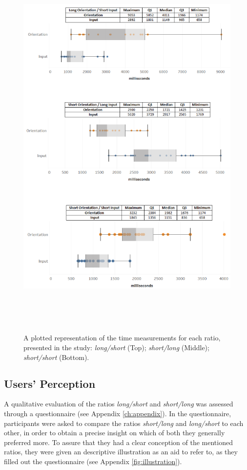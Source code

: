 \begin{figure}[t!]
\centering
\includegraphics[width=14cm, height=20cm]{Chapters/graphics/Times.png}
\caption{A plotted representation of the time measurements for each ratio, presented in the study: \textit{long/short} (Top);  \textit{short/long} (Middle); \textit{short/short} (Bottom).}
\label{fig:times}
\end{figure}

\subsection{Users' Perception}

A qualitative evaluation of the ratios \textit{long/short} and \textit{short/long} was assessed through a questionnaire (see Appendix \ref{ch:appendix}). In the questionnaire, participants were asked to compare the ratios \textit{short/long} and \textit{long/short} to each other, in order to obtain a precise insight on which of both they generally preferred more. To assure that they had a clear conception of the mentioned ratios, they were given an descriptive illustration as an aid to refer to, as they filled out the questionnaire (see Appendix \ref{fig:illustration}).\\

